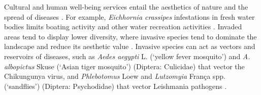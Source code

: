 Cultural and human well-being services entail the aesthetics of nature and the spread of diseases \citep{Vila2017}. For example, \textit{Eichhornia crassipes} infestations in fresh water bodies limits boating activity and other water recreation activities \citep{Villamagna2018}. Invaded areas tend to display lower diversity, where invasive species tend to dominate the landscape and reduce its aesthetic value \citep{Kueffer2017}. Invasive species can act as vectors and reservoirs of diseases, such as \textit{Aedes aegypti} L. (`yellow fever mosquito') and \textit{A. albopictus} Skuse (`Asian tiger mosquito') (Diptera: Culicidae) that vector the Chikungunya virus, and \textit{Phlebotomus} Loew and \textit{Lutzomyia} França spp. (`sandflies') (Diptera: Psychodidae) that vector Leishmania pathogens \citep{Rabitsch2017}. \\

